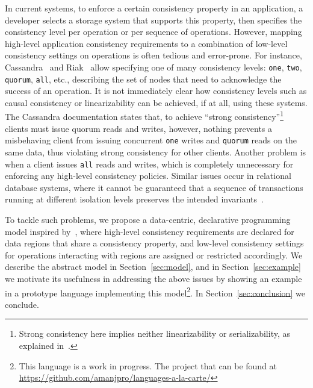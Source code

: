 \documentclass[preprint,numbers]{sigplanconf}
\begin{document}
In current systems, to enforce a certain consistency
property in an application, a developer selects a storage system that
supports this property, then specifies the consistency level per
operation or per
sequence of operations. However, mapping high-level application consistency requirements to a combination of
low-level consistency settings on operations is often tedious and error-prone.
For instance,
Cassandra~\cite{lakshman2010cassandra} and Riak~\cite{riak} allow specifying one of many
consistency levels:
\texttt{one}, \texttt{two}, \texttt{quorum}, \texttt{all}, etc., describing
the set of nodes that need to
acknowledge the success of an operation. It
is not immediately clear how consistency levels such as causal consistency or
linearizability can be achieved, if at all, using these systems. The Cassandra documentation
states that,
to achieve ``strong consistency''\footnote{Strong consistency here implies
neither linearizability or serializability, as explained in~\cite{sivaramakrishnan2016representation}.} clients must issue quorum reads and writes,
however, nothing prevents a misbehaving client from issuing concurrent \texttt{one} writes and
\texttt{quorum} reads on the same data, thus violating strong consistency for other clients. Another
problem is when a client issues \texttt{all} reads and writes, which is completely
unnecessary for enforcing any high-level consistency policies. Similar issues
occur in relational database systems, where it cannot be guaranteed that a
sequence of transactions running at different isolation levels preserves the intended
invariants~\cite{gray1992transaction}. 


To tackle such problems, we propose a data-centric, declarative programming
model inspired by~\cite{dolby2012data}, where
high-level consistency requirements are declared for data regions that share a
consistency property, and low-level consistency settings for operations interacting with
regions are assigned or restricted accordingly. We
describe the abstract model in Section~\ref{sec:model}, and in
Section~\ref{sec:example} we motivate its usefulness in addressing the above issues by showing
an example in a prototype language implementing this model\footnote{This
  language is a work in progress. The project that can be found at
  \url{https://github.com/amanjpro/languages-a-la-carte/}}.
In Section~\ref{sec:conclusion} we conclude.
\end{document}
